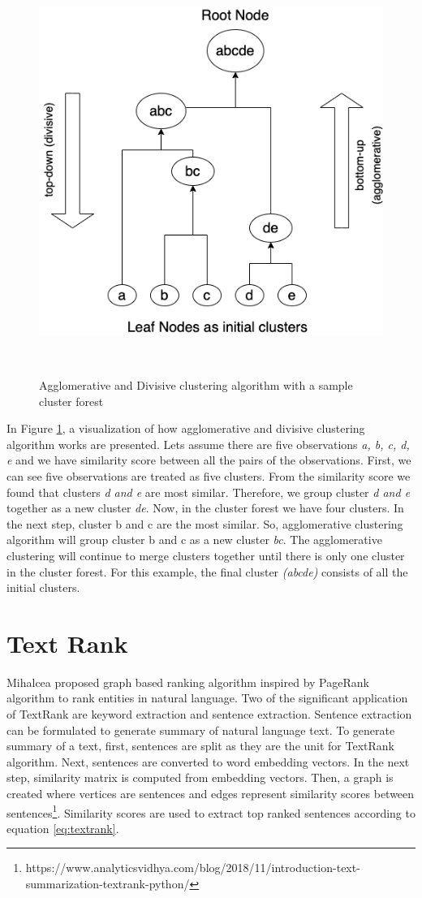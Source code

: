 \begin{figure}[h]
  \centering
  \includegraphics[width=0.5\columnwidth, height=0.5\columnwidth]{figures/background/agglomerative_clustering.png}
  \caption{Agglomerative and Divisive clustering algorithm with a sample cluster forest}~\label{fig:agglomerative_clustering}
\end{figure}
In Figure \ref{fig:agglomerative_clustering}, a visualization of how agglomerative and divisive clustering algorithm works are presented. Lets assume there are five observations \emph{a, b, c, d, e} and we have similarity score between all the pairs of the observations. First, we can see five observations are treated as five clusters. From the similarity score we found that clusters \emph{d and e} are most similar. Therefore, we group cluster \emph{d and e} together as a new cluster \emph{de}. Now, in the cluster forest we have four clusters. In the next step, cluster b and c are the most similar. So, agglomerative clustering algorithm will group cluster b and c as a new cluster \emph{bc}. The agglomerative clustering will continue to merge clusters together until there is only one cluster in the cluster forest. For this example, the final cluster \emph{(abcde)} consists of all the initial clusters. 

\section{Text Rank}
Mihalcea \cite{mihalcea2004textrank} proposed graph based ranking algorithm inspired by PageRank algorithm to rank entities in natural language. Two of the significant application of TextRank are keyword extraction and sentence extraction. Sentence extraction can be formulated to generate summary of natural language text. To generate summary of a  text, first, sentences are split as they are the unit for TextRank algorithm. Next, sentences are converted to word embedding vectors. In the next step, similarity matrix is computed from embedding vectors. Then, a graph is created where vertices are sentences and edges represent similarity scores between sentences\footnote{https://www.analyticsvidhya.com/blog/2018/11/introduction-text-summarization-textrank-python/}. Similarity scores are used to extract top ranked sentences according to equation \ref{eq:textrank}.


